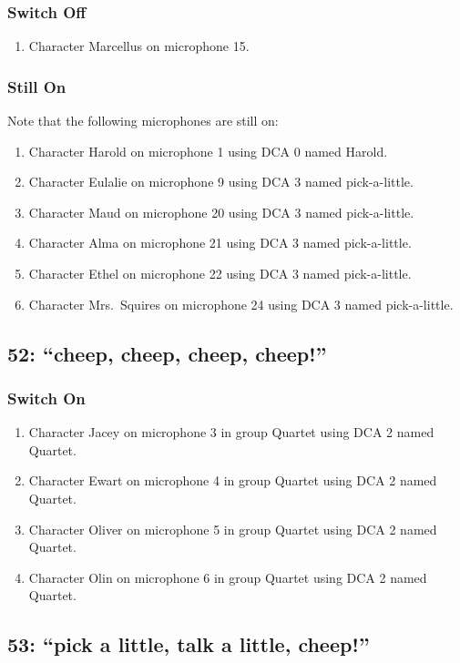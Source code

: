 \subsubsection* {Switch Off}
\begin{enumerate}
\item Character Marcellus on microphone 15.
\end{enumerate}
\subsubsection* {Still On}
Note that the following microphones are still on:
\begin{enumerate}
\item Character Harold on microphone 1 using DCA 0 named Harold.
\item Character Eulalie on microphone 9 using DCA 3 named pick-a-little.
\item Character Maud on microphone 20 using DCA 3 named pick-a-little.
\item Character Alma on microphone 21 using DCA 3 named pick-a-little.
\item Character Ethel on microphone 22 using DCA 3 named pick-a-little.
\item Character Mrs.~Squires on microphone 24 using DCA 3 named pick-a-little.
\end{enumerate}
\subsection* {52: ``cheep, cheep, cheep, cheep!''}
\subsubsection* {Switch On}
\begin{enumerate}
\item Character Jacey on microphone 3 in group Quartet using DCA 2 named Quartet.
\item Character Ewart on microphone 4 in group Quartet using DCA 2 named Quartet.
\item Character Oliver on microphone 5 in group Quartet using DCA 2 named Quartet.
\item Character Olin on microphone 6 in group Quartet using DCA 2 named Quartet.
\end{enumerate}
\subsection* {53: ``pick a little, talk a little, cheep!''}

